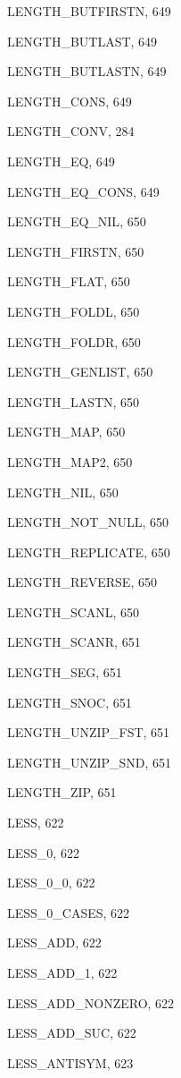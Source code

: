 \begin{theindex}
  \item {\ptt LENGTH\_BUTFIRSTN}, 649
  \item {\ptt LENGTH\_BUTLAST}, 649
  \item {\ptt LENGTH\_BUTLASTN}, 649
  \item {\ptt LENGTH\_CONS}, 649
  \item {\ptt LENGTH\_CONV}, 284
  \item {\ptt LENGTH\_EQ}, 649
  \item {\ptt LENGTH\_EQ\_CONS}, 649
  \item {\ptt LENGTH\_EQ\_NIL}, 650
  \item {\ptt LENGTH\_FIRSTN}, 650
  \item {\ptt LENGTH\_FLAT}, 650
  \item {\ptt LENGTH\_FOLDL}, 650
  \item {\ptt LENGTH\_FOLDR}, 650
  \item {\ptt LENGTH\_GENLIST}, 650
  \item {\ptt LENGTH\_LASTN}, 650
  \item {\ptt LENGTH\_MAP}, 650
  \item {\ptt LENGTH\_MAP2}, 650
  \item {\ptt LENGTH\_NIL}, 650
  \item {\ptt LENGTH\_NOT\_NULL}, 650
  \item {\ptt LENGTH\_REPLICATE}, 650
  \item {\ptt LENGTH\_REVERSE}, 650
  \item {\ptt LENGTH\_SCANL}, 650
  \item {\ptt LENGTH\_SCANR}, 651
  \item {\ptt LENGTH\_SEG}, 651
  \item {\ptt LENGTH\_SNOC}, 651
  \item {\ptt LENGTH\_UNZIP\_FST}, 651
  \item {\ptt LENGTH\_UNZIP\_SND}, 651
  \item {\ptt LENGTH\_ZIP}, 651
  \item {\ptt LESS}, 622
  \item {\ptt LESS\_0}, 622
  \item {\ptt LESS\_0\_0}, 622
  \item {\ptt LESS\_0\_CASES}, 622
  \item {\ptt LESS\_ADD}, 622
  \item {\ptt LESS\_ADD\_1}, 622
  \item {\ptt LESS\_ADD\_NONZERO}, 622
  \item {\ptt LESS\_ADD\_SUC}, 622
  \item {\ptt LESS\_ANTISYM}, 623

\end{theindex}

